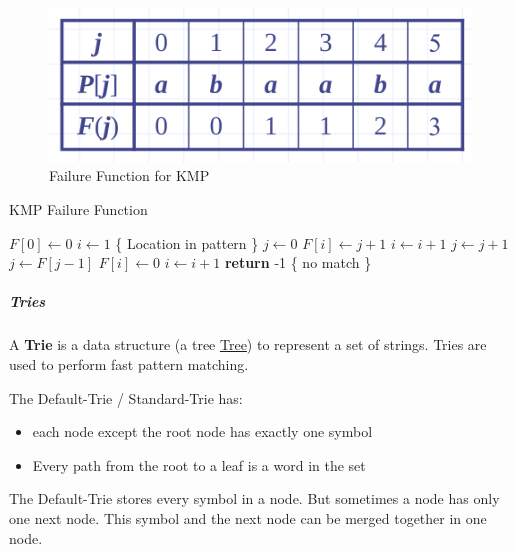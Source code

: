 \documentclass[11pt,twoside,twocolumn,landscape]{article}
\begin{document}
\begin{figure}[htbp]
\centering
\includegraphics[width=.9\linewidth]{img/kmp_failure_function.png}
\caption{\label{fig:orgaca2cea}Failure Function for KMP}
\end{figure}


\begin{algorithm}
  \caption{KMP Failure Function}
  \begin{algorithmic}[1]
    \State $F[0] \leftarrow 0$
    \State $i \leftarrow 1$ \{ Location in pattern \}
    \State $j \leftarrow 0$ 
    \State $F[i] \leftarrow  j + 1$
    \State $i \leftarrow i + 1$
    \State $j \leftarrow j + 1$
    \State $j \leftarrow F[j-1]$
    \Else
    \State $F[i] \leftarrow 0$
    \State $i \leftarrow i + 1$
    \EndIf
    \EndWhile
    \textbf{return} -1 \{ no match \}
    \EndProcedure
  \end{algorithmic}
\end{algorithm}

\subparagraph{Tries}
\label{sec:orgfa0004c}

A \textbf{Trie} is a data structure (a tree \href{../../../roam/20210806224741-tree.org}{Tree}) to represent a set of strings.
Tries are used to perform fast pattern matching.


The Default-Trie / Standard-Trie has:
\begin{itemize}
\item each node except the root node has exactly one symbol
\item Every path from the root to a leaf is a word in the set
\end{itemize}


The Default-Trie stores every symbol in a node.
But sometimes a node has only one next node.
This symbol and the next node can be merged together in one node.
\end{document}
